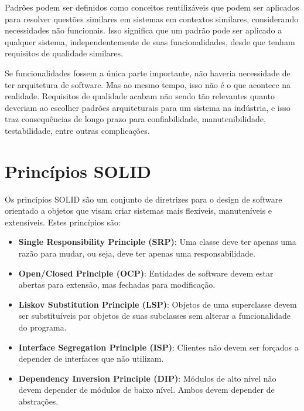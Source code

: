 Padrões podem ser definidos como conceitos reutilizáveis que podem ser aplicados para resolver questões similares em sistemas em contextos similares, considerando necessidades não funcionais. Isso significa que um padrão pode ser aplicado a qualquer sistema, independentemente de suas funcionalidades, desde que tenham requisitos de qualidade similares.

Se funcionalidades fossem a única parte importante, não haveria necessidade de ter arquitetura de software. Mas ao mesmo tempo, isso não é o que acontece na realidade. Requisitos de qualidade acabam não sendo tão relevantes quanto deveriam ao escolher padrões arquiteturais para um sistema na indústria, e isso traz consequências de longo prazo para confiabilidade, manutenibilidade, testabilidade, entre outras complicações.

\section{Princípios SOLID}

Os princípios SOLID são um conjunto de diretrizes para o design de software orientado a objetos que visam criar sistemas mais flexíveis, manuteníveis e extensíveis. Estes princípios são:

\begin{itemize}
    \item \textbf{Single Responsibility Principle (SRP)}: Uma classe deve ter apenas uma razão para mudar, ou seja, deve ter apenas uma responsabilidade.
    
    \item \textbf{Open/Closed Principle (OCP)}: Entidades de software devem estar abertas para extensão, mas fechadas para modificação.
    
    \item \textbf{Liskov Substitution Principle (LSP)}: Objetos de uma superclasse devem ser substituíveis por objetos de suas subclasses sem alterar a funcionalidade do programa.
    
    \item \textbf{Interface Segregation Principle (ISP)}: Clientes não devem ser forçados a depender de interfaces que não utilizam.
    
    \item \textbf{Dependency Inversion Principle (DIP)}: Módulos de alto nível não devem depender de módulos de baixo nível. Ambos devem depender de abstrações.
\end{itemize}

